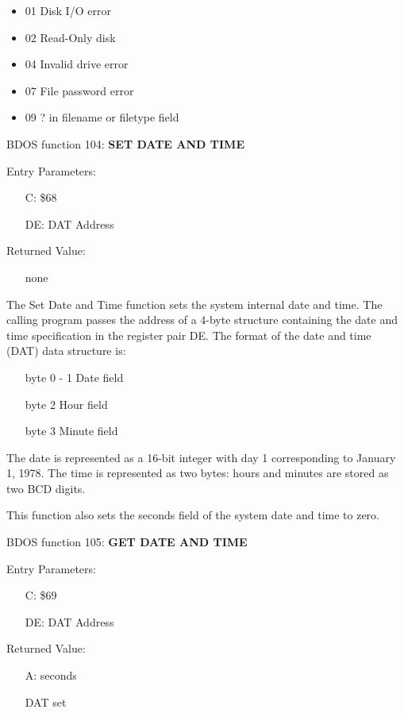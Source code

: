 \begin{itemize}
\item 01 Disk I/O error
\item 02 Read-Only disk
\item 04 Invalid drive error
\item 07 File password error
\item 09 ? in filename or filetype field
\end{itemize}

BDOS function 104: \textbf{SET DATE AND TIME}

Entry Parameters:
\begin{itemize}
\item[] C: \$68
\item[] DE: DAT Address
\end{itemize}

Returned Value:
\begin{itemize}
\item[] none
\end{itemize}

The Set Date and Time function sets the system internal date and
time. The calling program passes the address of a 4-byte structure
containing the date and time specification in the register pair
DE. The format of the date and time (DAT) data structure is:

\begin{itemize}
\item[byte] 0 - 1 Date field
\item[byte] 2 Hour field
\item[byte] 3 Minute field
\end{itemize}

The date is represented as a 16-bit integer with day 1 corresponding
to January 1, 1978. The time is represented as two bytes: hours and
minutes are stored as two BCD digits.

This function also sets the seconds field of the system date and time
to zero.

BDOS function 105: \textbf{GET DATE AND TIME}

Entry Parameters:
\begin{itemize}
\item[] C: \$69
\item[] DE: DAT Address
\end{itemize}

Returned Value:
\begin{itemize}
\item[] A: seconds
\item[] DAT set
\end{itemize}

